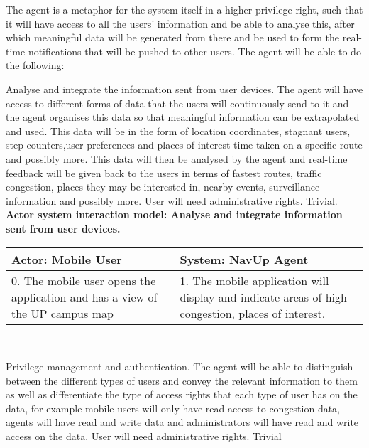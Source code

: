 The agent is a metaphor for the system itself in a higher privilege right, such that it will have access to all the users' information and be able to analyse this, after which meaningful data will be generated from there and be used to form the real-time notifications that will be pushed to other users. The agent will be able to do the following:
\\
\bigskip

\FuncReq
{Analyse and integrate the information sent from user devices.}
{The agent will have access to different forms of data that the users will continuously send to it and the agent organises this data so that meaningful information can be extrapolated and used. This data will be in the form of location coordinates, stagnant users, step counters,user preferences and places of interest time taken on a specific route and possibly more. This data will then be analysed by the agent and real-time feedback will be given back to the users in terms of fastest routes, traffic congestion, places they may be interested in, nearby events, surveillance information and possibly more.}
{User will need administrative rights.}
{Trivial.}
    \\
    \textbf{Actor system interaction model: Analyse and integrate information sent from user devices. }\\
    \begin{tabular}{ | p{6cm} | p{6cm} |}
    \hline
    Actor: Mobile User & System: NavUp Agent\\ \hline
     0. The mobile user opens the application and has a view of the UP campus map & 1. The mobile application will display and indicate areas of high congestion, places of interest.\\ \hline
    
    \end{tabular}
\\
\bigskip


\FuncReq
{Privilege management and authentication.}
{The agent will be able to distinguish between the different types of users and convey the relevant information to them as well as differentiate the type of access rights that each type of user has on the data, for example mobile users will only have read access to congestion data, agents will have read and write data and administrators will have read and write access on the data.}
{User will need administrative rights.}
{Trivial}